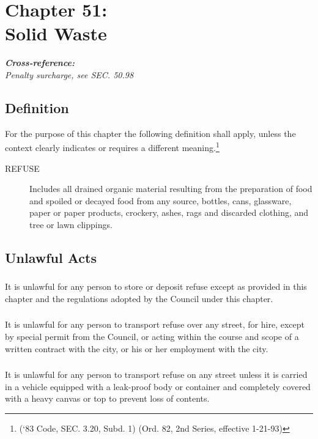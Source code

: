 \chapter*{Chapter 51: \\
	Solid Waste}
    \vfill
    \minitoc
    \textbf{\emph{{Cross-reference:}}}\\
    \indent\emph{Penalty surcharge, see SEC. 50.98}
    \pagebreak

\section{Definition}
For the purpose of this chapter the following definition shall apply, unless the context clearly indicates or requires a different meaning.\footnote{(‘83 Code, SEC. 3.20, Subd. 1) (Ord. 82, 2nd Series, effective 1-21-93)}
\begin{description}
    \item[REFUSE] Includes all drained organic material resulting from the preparation of food and spoiled or decayed food from any source, bottles, cans, glassware, paper or paper products, crockery, ashes, rags and discarded clothing, and tree or lawn clippings.
\end{description}

\section{Unlawful Acts}
\subsection{}
It is unlawful for any person to store or deposit refuse except as provided in this chapter and the regulations adopted by the Council under this chapter.
\subsection{}
It is unlawful for any person to transport refuse over any street, for hire, except by special permit from the Council, or acting within the course and scope of a written contract with the city, or his or her employment with the city.
\subsection{}
It is unlawful for any person to transport refuse on any street unless it is carried in a vehicle equipped with a leak-proof body or container and completely covered with a heavy canvas or top to prevent loss of contents.
